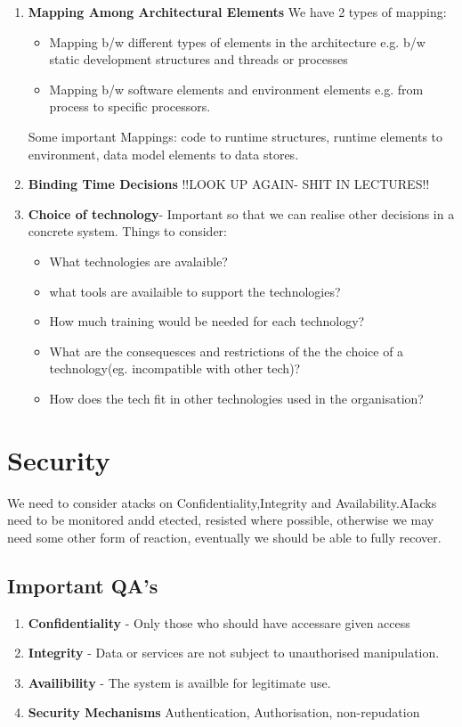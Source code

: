 \documentclass[a4paper]{report}
\begin{document}
\begin{enumerate}
\item \textbf{Mapping Among Architectural Elements}
We have 2 types of mapping:
\begin{itemize}
\item Mapping b/w different types of elements in the architecture e.g. b/w static development structures and threads or processes
\item Mapping b/w software elements and environment elements e.g. from process to specific processors.
\end{itemize}
Some important Mappings: code to runtime structures, runtime elements to environment, data model elements to data stores.

\item \textbf{Binding Time Decisions}
!!LOOK UP AGAIN- SHIT IN LECTURES!!

\item \textbf{Choice of technology}- Important so that we can realise other decisions in a concrete system. Things to consider:
\begin{itemize}
\item What technologies are avalaible?
\item what tools are availaible to support the technologies?
\item How much training would be needed for each technology?
\item What are the consequesces and restrictions of the the choice of a technology(eg. incompatible with other tech)?
\item How does the tech fit in other technologies used in the organisation?
\end{itemize}
\end{enumerate}


\chapter{Security}
We need to consider atacks on Confidentiality,Integrity and Availability.AIacks need to be monitored andd etected, resisted where possible, otherwise we may need some other form of reaction, eventually we should be able to fully recover.
\section{Important QA's}
\begin{enumerate}
\item \textbf{Confidentiality} - Only those who should have accessare given access
\item \textbf{Integrity} -  Data or services are not subject to unauthorised manipulation.
\item \textbf{Availibility} -  The system is availble for legitimate use.
\item \textbf{Security Mechanisms} Authentication, Authorisation, non-repudation
\end{enumerate}
\end{document}
